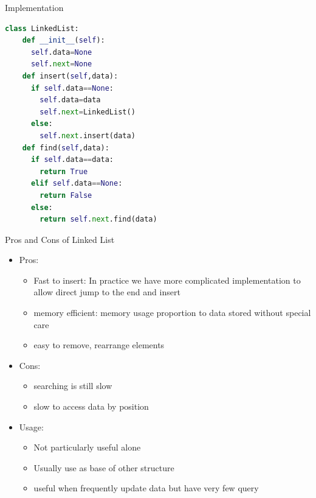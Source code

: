 \documentclass[10pt,xcolor={table,dvipsnames},t]{beamer}
\begin{document}
\begin{frame}[fragile]{Implementation}
\begin{lstlisting}[language=python]
  class LinkedList:
    def __init__(self):
      self.data=None
      self.next=None
    def insert(self,data):
      if self.data==None:
        self.data=data
        self.next=LinkedList()
      else:
        self.next.insert(data)
    def find(self,data):
      if self.data==data:
        return True
      elif self.data==None:
        return False
      else:
        return self.next.find(data)
\end{lstlisting}
\end{frame}

\begin{frame}{Pros and Cons of Linked List}
  \begin{itemize}
    \item Pros:
    \begin{itemize}
      \item Fast to insert: In practice we have more complicated implementation to allow direct jump to the end and insert
      \item memory efficient: memory usage proportion to data stored without special care
      \item easy to remove, rearrange elements
    \end{itemize}
    \item Cons:
    \begin{itemize}
      \item searching is still slow
      \item slow to access data by position
    \end{itemize}
    \item Usage:
    \begin{itemize}
      \item Not particularly useful alone
      \item Usually use as base of other structure
      \item useful when frequently update data but have very few query
    \end{itemize}
  \end{itemize}
\end{frame}
\end{document}
